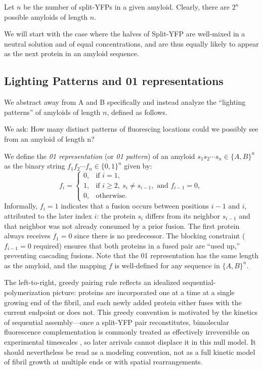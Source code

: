 \documentclass[referee,lineno,pdflatex,sn-mathphys-ay]{sn-jnl}
\begin{document}
Let $n$ be the number of split-YFPs in a given amyloid. Clearly, there are $2^n$ possible amyloids of length $n$.

We will start with the case where the halves of Split-YFP are well-mixed in a neutral solution and of equal concentrations, and are thus equally likely to appear as the next protein in an amyloid sequence. 

\subsection{Lighting Patterns and 01 representations}

We abstract away from A and B specifically and instead analyze the ``lighting patterns'' of amyloids of length $n$, defined as follows.

We ask: How many distinct patterns of fluorescing locations could we possibly see from an amyloid of length n?

We define the \textit{01 representation} (or \textit{01 pattern}) of an amyloid $s_1 s_2 \cdots s_n \in \{A,B\}^n$ as the binary string $f_1 f_2 \cdots f_n \in \{0,1\}^n$ given by:
\[
f_i = \begin{cases}
0, & \text{if } i = 1, \\
1, & \text{if } i \ge 2,\ s_i \neq s_{i-1}, \text{ and } f_{i-1} = 0, \\
0, & \text{otherwise.}
\end{cases}
\]
Informally, $f_i = 1$ indicates that a fusion occurs between positions $i-1$ and $i$, attributed to the later index $i$: the protein $s_i$ differs from its neighbor $s_{i-1}$ and that neighbor was not already consumed by a prior fusion. The first protein always receives $f_1 = 0$ since there is no predecessor. The blocking constraint ($f_{i-1} = 0$ required) ensures that both proteins in a fused pair are ``used up,'' preventing cascading fusions. Note that the 01 representation has the same length as the amyloid, and the mapping $f$ is well-defined for any sequence in $\{A,B\}^n$.

The left-to-right, greedy pairing rule reflects an idealized sequential-polymerization picture: proteins are incorporated one at a time at a single growing end of the fibril, and each newly added protein either fuses with the current endpoint or does not. This greedy convention is motivated by the kinetics of sequential assembly---once a split-YFP pair reconstitutes, bimolecular fluorescence complementation is commonly treated as effectively irreversible on experimental timescales \citep{hu2002,kerppola2006}, so later arrivals cannot displace it in this null model. It should nevertheless be read as a modeling convention, not as a full kinetic model of fibril growth at multiple ends or with spatial rearrangements.
\end{document}

